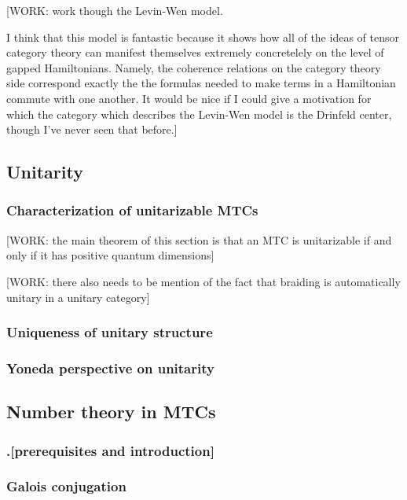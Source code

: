 [WORK: work though the Levin-Wen model.

I think that this model is fantastic because it shows how all of the ideas of tensor category theory can manifest themselves extremely concretelely on the level of gapped Hamiltonians. Namely, the coherence relations on the category theory side correspond exactly the the formulas needed to make terms in a Hamiltonian commute with one another. It would be nice if I could give a motivation for which the category which describes the Levin-Wen model is the Drinfeld center, though I've never seen that before.]




\subsection{Unitarity}

\subsubsection{Characterization of unitarizable MTCs}

[WORK: the main theorem of this section is that an MTC is unitarizable if and only if it has positive quantum dimensions]

[WORK: there also needs to be mention of the fact that braiding is automatically unitary in a unitary category]

\subsubsection{Uniqueness of unitary structure}

\subsubsection{Yoneda perspective on unitarity}




\subsection{Number theory in MTCs}

\subsubsection{.[prerequisites and introduction]}

\subsubsection{Galois conjugation}

